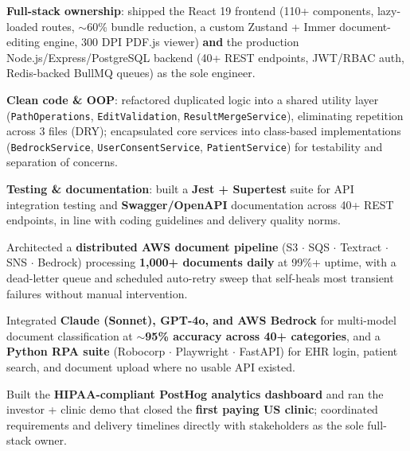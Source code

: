 \documentclass[a4paper,10pt]{article}
\begin{document}
\vspace{2pt}
\begin{itemize}[leftmargin=0.15in, itemsep=1pt]
    \small{\item
    \textbf{Full-stack ownership}: shipped the React 19 frontend (110+ components, lazy-loaded routes, $\sim$60\% bundle reduction, a custom Zustand + Immer document-editing engine, 300 DPI PDF.js viewer) \textbf{and} the production Node.js/Express/PostgreSQL backend (40+ REST endpoints, JWT/RBAC auth, Redis-backed BullMQ queues) as the sole engineer.
    }

    \small{\item
    \textbf{Clean code \& OOP}: refactored duplicated logic into a shared utility layer (\texttt{PathOperations}, \texttt{EditValidation}, \texttt{ResultMergeService}), eliminating repetition across 3 files (DRY); encapsulated core services into class-based implementations (\texttt{BedrockService}, \texttt{UserConsentService}, \texttt{PatientService}) for testability and separation of concerns.
    }

    \small{\item
    \textbf{Testing \& documentation}: built a \textbf{Jest + Supertest} suite for API integration testing and \textbf{Swagger/OpenAPI} documentation across 40+ REST endpoints, in line with coding guidelines and delivery quality norms.
    }

    \small{\item
    Architected a \textbf{distributed AWS document pipeline} (S3 $\cdot$ SQS $\cdot$ Textract $\cdot$ SNS $\cdot$ Bedrock) processing \textbf{1,000+ documents daily} at 99\%+ uptime, with a dead-letter queue and scheduled auto-retry sweep that self-heals most transient failures without manual intervention.
    }

    \small{\item
    Integrated \textbf{Claude (Sonnet), GPT-4o, and AWS Bedrock} for multi-model document classification at \textbf{$\sim$95\% accuracy across 40+ categories}, and a \textbf{Python RPA suite} (Robocorp $\cdot$ Playwright $\cdot$ FastAPI) for EHR login, patient search, and document upload where no usable API existed.
    }

    \small{\item
    Built the \textbf{HIPAA-compliant PostHog analytics dashboard} and ran the investor + clinic demo that closed the \textbf{first paying US clinic}; coordinated requirements and delivery timelines directly with stakeholders as the sole full-stack owner.
    }
\end{itemize}
\end{document}
